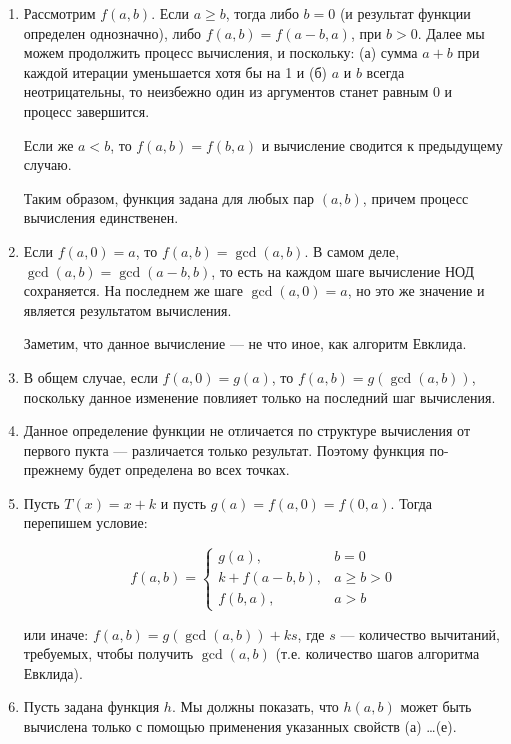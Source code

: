 ﻿

\begin{enumerate}
\item Рассмотрим $f(a,b)$. Если $a \ge b$, тогда либо $b = 0$ (и результат функции определен однозначно),
либо $f(a,b) = f(a-b,a)$, при $b > 0$. Далее мы можем продолжить процесс вычисления, и поскольку:
(а) сумма $a+b$ при каждой итерации уменьшается хотя бы на 1 и (б) $a$ и $b$ всегда неотрицательны, 
то неизбежно один из аргументов станет равным $0$ и процесс завершится. 

Если же $a < b$, то $f(a,b) = f(b,a)$ и вычисление сводится к предыдущему случаю.

Таким образом, функция задана для любых пар $(a,b)$, причем процесс вычисления единственен.

\item Если $f(a,0) = a$, то $f(a,b) = \gcd(a,b)$.
В самом деле, $\gcd(a,b) = \gcd(a-b,b)$, то есть на каждом шаге вычисление НОД сохраняется.
На последнем же шаге $\gcd(a,0) = a$, но это же значение и является результатом вычисления.

Заметим, что данное вычисление --- не что иное, как алгоритм Евклида.

\item В общем случае, если $f(a,0) = g(a)$, то $f(a,b) = g(\gcd(a,b))$, поскольку данное 
изменение повлияет только на последний шаг вычисления.

\item Данное определение функции не отличается по структуре вычисления от первого пукта ---
различается только результат. Поэтому функция по-прежнему будет определена во всех точках.

\item Пусть $T(x) = x + k$ и пусть $g(a) = f(a,0) = f(0,a)$. Тогда перепишем условие:

$$f(a,b) = \left\{\begin{array}{ll}
   g(a), & b = 0\\
   k+f(a-b,b), & a \ge b > 0\\
   f(b,a), & a > b\end{array}\right.$$

или иначе: $f(a,b) = g(\gcd(a,b)) + ks$, где $s$ --- количество вычитаний, требуемых,
чтобы получить $\gcd(a,b)$ (т.е. количество шагов алгоритма Евклида). 

\item Пусть задана функция $h$. Мы должны показать, что $h(a,b)$ может быть вычислена 
только с помощью применения указанных свойств (а) \dots (е).


\end{enumerate}
